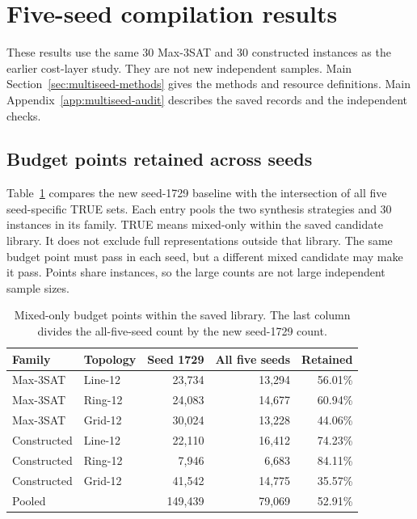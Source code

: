 \documentclass[a4paper,onecolumn,11pt,unpublished]{quantumarticle}
\theoremstyle{remark}
\begin{document}
\FloatBarrier

\section{Five-seed compilation results}
\label{supp:multiseed-results}
These results use the same 30 Max-3SAT and 30 constructed instances as
the earlier cost-layer study. They are not new independent samples.
Main Section~\ref{sec:multiseed-methods} gives the methods and resource
definitions. Main Appendix~\ref{app:multiseed-audit} describes the saved
records and the independent checks.

\subsection{Budget points retained across seeds}
Table~\ref{tab:multiseed-retention} compares the new seed-1729 baseline
with the intersection of all five seed-specific TRUE sets.
Each entry pools the two synthesis strategies and 30 instances in its
family. TRUE means mixed-only within the saved candidate library.
It does not exclude full representations outside that library.
The same budget point must pass in each seed, but a different mixed
candidate may make it pass. Points share instances, so the large counts
are not large independent sample sizes.

\begin{table}[htbp]\centering\small
\caption{Mixed-only budget points within the saved library. The last
column divides the all-five-seed count by the new seed-1729 count.}
\label{tab:multiseed-retention}
\begin{tabular}{llrrr}\toprule
Family & Topology & Seed 1729 & All five seeds & Retained\\\midrule
Max-3SAT & Line-12 & 23,734 & 13,294 & 56.01\%\\
Max-3SAT & Ring-12 & 24,083 & 14,677 & 60.94\%\\
Max-3SAT & Grid-12 & 30,024 & 13,228 & 44.06\%\\
Constructed & Line-12 & 22,110 & 16,412 & 74.23\%\\
Constructed & Ring-12 & 7,946 & 6,683 & 84.11\%\\
Constructed & Grid-12 & 41,542 & 14,775 & 35.57\%\\\midrule
Pooled & & 149,439 & 79,069 & 52.91\%\\\bottomrule
\end{tabular}\end{table}
\end{document}

